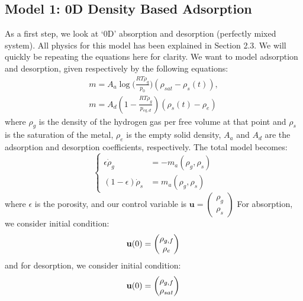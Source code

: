 \subsection{Model 1: 0D Density Based Adsorption}\label{subseq:model_1}

As a first step, we look at `0D' absorption and desorption (perfectly mixed system). All physics for this model has been explained in Section 2.3. We will quickly be repeating the equations here for clarity. We want to model adsorption and desorption, given respectively by the following equations:
\begin{align}\label{eq:model_1_mdot}
     m = A_a \log \big(\frac{RT\rho_g}{p_0}\big) (\rho_{sat}-\rho_s(t)), \\
     m = A_d (1-\frac{RT\rho_g}{p_{eq,d}})(\rho_s(t)-\rho_e)
\end{align}
where $\rho_g$ is the density of the hydrogen gas per free volume at that point and $\rho_s$ is the saturation of the metal, $\rho_e$ is the empty solid density, $A_a$ and $A_d$ are the adsorption and desorption coefficients, respectively. The total model becomes:
\begin{equation}\label{eq:model_1}
\left\{\begin{aligned}
    \epsilon\dot{\rho}_g&=- m_a(\rho_g, \rho_s) \\
    (1-\epsilon)\dot{\rho}_s&= m_a(\rho_g, \rho_s)
\end{aligned}\right.
\end{equation}
where $\epsilon$ is the porosity, and our control variable is $\mathbf{u} = \begin{pmatrix}
    \rho_g \\ \rho_s
\end{pmatrix}$
For absorption, we consider initial condition:
\begin{equation}
    \mathbf{u}(0) = \begin{pmatrix}\rho_{g, f} \\ \rho_{e}\end{pmatrix} \\
\end{equation}
and for desorption, we consider initial condition:
\begin{equation}
    \mathbf{u}(0) = \begin{pmatrix}\rho_{g, f} \\ \rho_{sat}\end{pmatrix} \\
\end{equation}

